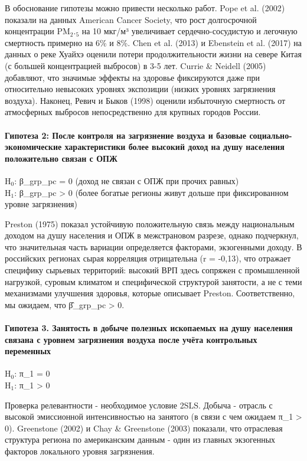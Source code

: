 \documentclass[11pt,a4paper]{article}
\begin{document}
В обоснование гипотезы можно привести несколько работ. Pope et al. (2002) показали на данных American Cancer Society, что рост долгосрочной концентрации PM$_2$.$_5$ на 10 мкг/м³ увеличивает сердечно-сосудистую и легочную смертность примерно на 6\% и 8\%. Chen et al. (2013) и Ebenstein et al. (2017) на данных о реке Хуайхэ оценили потери продолжительности жизни на севере Китая (с большей концентрацией выбросов) в 3-5 лет. Currie \& Neidell (2005) добавляют, что значимые эффекты на здоровье фиксируются даже при относительно невысоких уровнях экспозиции (низких уровнях загрязнения воздуха). Наконец, Ревич и Быков (1998) оценили избыточную смертность от атмосферных выбросов непосредственно для крупных городов России.

\paragraph{Гипотеза 2: После контроля на загрязнение воздуха и базовые социально-экономические характеристики более высокий доход на душу населения положительно связан с ОПЖ}
\begin{center}\small H$_0$: β\_grp\_pc = 0 (доход не связан с ОПЖ при прочих равных) \\ H$_1$: β\_grp\_pc > 0 (более богатые регионы живут дольше при фиксированном уровне загрязнения)\end{center}
Preston (1975) показал устойчивую положительную связь между национальным доходом на душу населения и ОПЖ в межстрановом разрезе, однако подчеркнул, что значительная часть вариации определяется факторами, экзогенными доходу. В российских регионах сырая корреляция отрицательна (r = -0,13), что отражает специфику сырьевых территорий: высокий ВРП здесь сопряжен с промышленной нагрузкой, суровым климатом и специфической структурой занятости, а не с теми механизмами улучшения здоровья, которые описывает Preston. Соответственно, мы ожидаем, что β̂\_grp\_pc > 0.

\paragraph{Гипотеза 3. Занятость в добыче полезных ископаемых на душу населения связана с уровнем загрязнения воздуха после учёта контрольных переменных}
\begin{center}\small H$_0$: π\_1 = 0 \\ H$_1$: π\_1 > 0\end{center}
Проверка релевантности - необходимое условие 2SLS. Добыча - отрасль с высокой эмиссионной интенсивностью на занятого (в связи с чем ожидаем π\_1 > 0). Greenstone (2002) и Chay \& Greenstone (2003) показали, что отраслевая структура региона по американским данным - один из главных экзогенных факторов локального уровня загрязнения.
\end{document}
